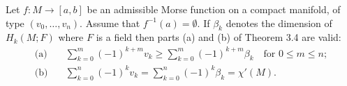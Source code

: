 Let $f: M \rightarrow [a,b]$ be an admissible Morse function on a compact manifold, of type $(v_0, \ldots, v_n)$. Assume that $f^{-1}(a) = \emptyset$. If $\beta_k$ denotes the dimension of $H_k(M;F)$ where $F$ is a field then parts (a) and (b) of Theorem 3.4 are valid:
\begin{align*}
\text{(a)}\quad &\sum_{k=0}^{m} (-1)^{k+m} v_k \geqslant \sum_{k=0}^{m} (-1)^{k+m} \beta_k \quad \text{for } 0 \leqslant m \leqslant n; \\
\text{(b)}\quad &\sum_{k=0}^{n} (-1)^k v_k = \sum_{k=0}^{n} (-1)^k \beta_k = \chi'(M).
\end{align*}

